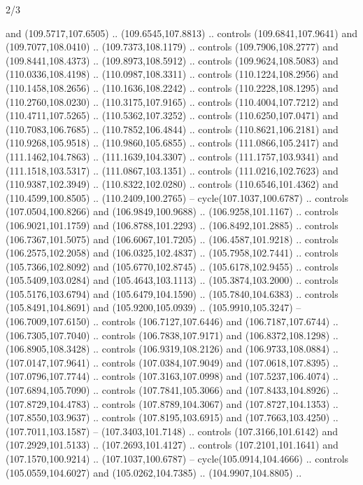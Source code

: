 \begin{flagdescription}{2/3}
\begin{scope}[shift={(0.5\flaglength,0.5)},scale=\flagwidth/320]
\begin{scope}[y=0.8pt, x=0.8pt, yscale=-1,shift={(-118.3,-146)}]
  and (109.5717,107.6505) .. (109.6545,107.8813) .. controls (109.6841,107.9641)
  and (109.7077,108.0410) .. (109.7373,108.1179) .. controls (109.7906,108.2777)
  and (109.8441,108.4373) .. (109.8973,108.5912) .. controls (109.9624,108.5083)
  and (110.0336,108.4198) .. (110.0987,108.3311) .. controls (110.1224,108.2956)
  and (110.1458,108.2656) .. (110.1636,108.2242) .. controls (110.2228,108.1295)
  and (110.2760,108.0230) .. (110.3175,107.9165) .. controls (110.4004,107.7212)
  and (110.4711,107.5265) .. (110.5362,107.3252) .. controls (110.6250,107.0471)
  and (110.7083,106.7685) .. (110.7852,106.4844) .. controls (110.8621,106.2181)
  and (110.9268,105.9518) .. (110.9860,105.6855) .. controls (111.0866,105.2417)
  and (111.1462,104.7863) .. (111.1639,104.3307) .. controls (111.1757,103.9341)
  and (111.1518,103.5317) .. (111.0867,103.1351) .. controls (111.0216,102.7623)
  and (110.9387,102.3949) .. (110.8322,102.0280) .. controls (110.6546,101.4362)
  and (110.4599,100.8505) .. (110.2409,100.2765) -- cycle(107.1037,100.6787) ..
  controls (107.0504,100.8266) and (106.9849,100.9688) .. (106.9258,101.1167) ..
  controls (106.9021,101.1759) and (106.8788,101.2293) .. (106.8492,101.2885) ..
  controls (106.7367,101.5075) and (106.6067,101.7205) .. (106.4587,101.9218) ..
  controls (106.2575,102.2058) and (106.0325,102.4837) .. (105.7958,102.7441) ..
  controls (105.7366,102.8092) and (105.6770,102.8745) .. (105.6178,102.9455) ..
  controls (105.5409,103.0284) and (105.4643,103.1113) .. (105.3874,103.2000) ..
  controls (105.5176,103.6794) and (105.6479,104.1590) .. (105.7840,104.6383) ..
  controls (105.8491,104.8691) and (105.9200,105.0939) .. (105.9910,105.3247) --
  (106.7009,107.6150) .. controls (106.7127,107.6446) and (106.7187,107.6744) ..
  (106.7305,107.7040) .. controls (106.7838,107.9171) and (106.8372,108.1298) ..
  (106.8905,108.3428) .. controls (106.9319,108.2126) and (106.9733,108.0884) ..
  (107.0147,107.9641) .. controls (107.0384,107.9049) and (107.0618,107.8395) ..
  (107.0796,107.7744) .. controls (107.3163,107.0998) and (107.5237,106.4074) ..
  (107.6894,105.7090) .. controls (107.7841,105.3066) and (107.8433,104.8926) ..
  (107.8729,104.4783) .. controls (107.8789,104.3067) and (107.8727,104.1353) ..
  (107.8550,103.9637) .. controls (107.8195,103.6915) and (107.7663,103.4250) ..
  (107.7011,103.1587) -- (107.3403,101.7148) .. controls (107.3166,101.6142) and
  (107.2929,101.5133) .. (107.2693,101.4127) .. controls (107.2101,101.1641) and
  (107.1570,100.9214) .. (107.1037,100.6787) -- cycle(105.0914,104.4666) ..
  controls (105.0559,104.6027) and (105.0262,104.7385) .. (104.9907,104.8805) ..

\end{scope}
\end{scope}
\end{flagdescription}
